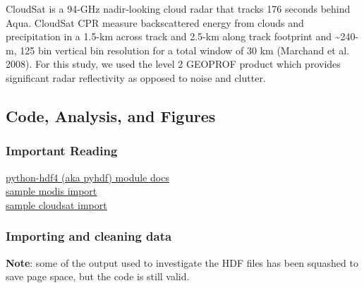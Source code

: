 \documentclass[11pt]{article}
\begin{document}
CloudSat is a 94-GHz nadir-looking cloud radar that tracks 176 seconds
behind Aqua. CloudSat CPR measure backscattered energy from clouds and
precipitation in a 1.5-km across track and 2.5-km along track footprint
and \textasciitilde{}240-m, 125 bin vertical bin resolution for a total
window of 30 km (Marchand et al. 2008). For this study, we used the
level 2 GEOPROF product which provides significant radar reflectivity as
opposed to noise and clutter.

    \subsection{Code, Analysis, and
Figures}\label{code-analysis-and-figures}

    \subsubsection{Important Reading}\label{important-reading}

\href{http://fhs.github.io/python-hdf4/}{python-hdf4 (aka pyhdf) module
docs}\\
\href{http://hdfeos.org/zoo/LAADS/MOD08_D3_Cloud_Fraction_Liquid.py}{sample
modis import}\\
\href{http://hdfeos.org/zoo/OTHER/2010128055614_21420_CS_2B-GEOPROF_GRANULE_P_R04_E03.hdf.py}{sample
cloudsat import}

    \subsubsection{Importing and cleaning
data}\label{importing-and-cleaning-data}

\textbf{Note}: some of the output used to investigate the HDF files has
been squashed to save page space, but the code is still valid.
\end{document}
